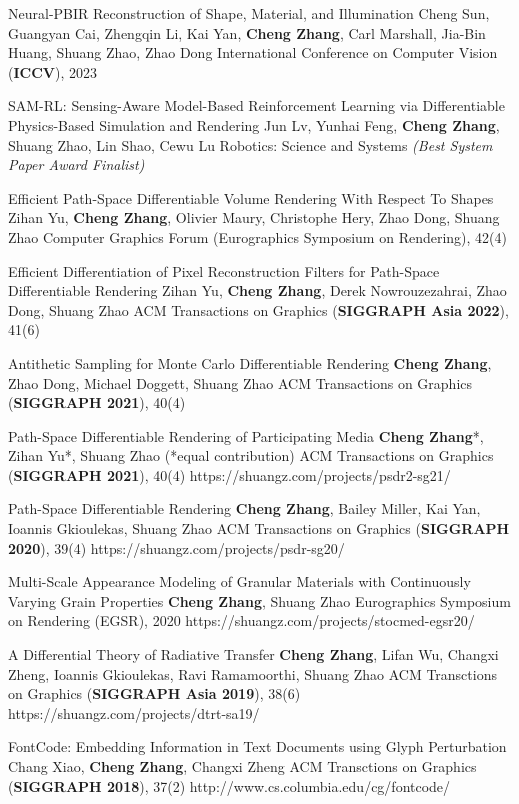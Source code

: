 
\begin{cvpublications}{}

    \cvpublication
	{Neural-PBIR Reconstruction of Shape, Material, and Illumination}
	{Cheng Sun, Guangyan Cai, Zhengqin Li, Kai Yan, \textbf{Cheng Zhang}, Carl Marshall, Jia-Bin Huang, Shuang Zhao, Zhao Dong}
	{International Conference on Computer Vision (\textbf{ICCV}), 2023}
	{}

    \cvpublication
	{SAM-RL: Sensing-Aware Model-Based Reinforcement Learning via Differentiable Physics-Based Simulation and Rendering}
	{Jun Lv, Yunhai Feng, \textbf{Cheng Zhang}, Shuang Zhao, Lin Shao, Cewu Lu}
	{Robotics: Science and Systems \emph{(Best System Paper Award Finalist)}}
	{}


    \cvpublication
	{Efficient Path-Space Differentiable Volume Rendering With Respect To Shapes}
	{Zihan Yu, \textbf{Cheng Zhang}, Olivier Maury, Christophe Hery, Zhao Dong, Shuang Zhao}
	{Computer Graphics Forum (Eurographics Symposium on Rendering), 42(4)}
	{}

    \cvpublication
	{Efficient Differentiation of Pixel Reconstruction Filters for Path-Space Differentiable Rendering}
	{Zihan Yu, \textbf{Cheng Zhang},  Derek Nowrouzezahrai, Zhao Dong, Shuang Zhao}
	{ACM Transactions on Graphics (\textbf{SIGGRAPH Asia 2022}), 41(6)}
	{}

    \cvpublication
	{Antithetic Sampling for Monte Carlo Differentiable Rendering}
	{\textbf{Cheng Zhang}, Zhao Dong, Michael Doggett, Shuang Zhao}
	{ACM Transactions on Graphics (\textbf{SIGGRAPH 2021}), 40(4)}
	{}


    \cvpublication
	{Path-Space Differentiable Rendering of Participating Media}
	{\textbf{Cheng Zhang}*, Zihan Yu*, Shuang Zhao (*equal contribution)}
	{ACM Transactions on Graphics (\textbf{SIGGRAPH 2021}), 40(4)}
	{https://shuangz.com/projects/psdr2-sg21/}


    \cvpublication
	{Path-Space Differentiable Rendering}
	{\textbf{Cheng Zhang}, Bailey Miller, Kai Yan, Ioannis Gkioulekas, Shuang Zhao}
	{ACM Transactions on Graphics (\textbf{SIGGRAPH 2020}), 39(4)}
	{https://shuangz.com/projects/psdr-sg20/}

    \cvpublication
	{Multi-Scale Appearance Modeling of Granular Materials with Continuously Varying Grain Properties}
	{\textbf{Cheng Zhang}, Shuang Zhao}
	{Eurographics Symposium on Rendering (EGSR), 2020}
	{https://shuangz.com/projects/stocmed-egsr20/}

    \cvpublication
	{A Differential Theory of Radiative Transfer}
	{\textbf{Cheng Zhang}, Lifan Wu, Changxi Zheng, Ioannis Gkioulekas, Ravi Ramamoorthi, Shuang Zhao}
	{ACM Transctions on Graphics (\textbf{SIGGRAPH Asia 2019}), 38(6)}
	{https://shuangz.com/projects/dtrt-sa19/}

	\cvpublication
	{FontCode: Embedding Information in Text Documents using Glyph Perturbation}
	{Chang Xiao, \textbf{Cheng Zhang}, Changxi Zheng}
	{ACM Transctions on Graphics (\textbf{SIGGRAPH 2018}), 37(2)}
	{http://www.cs.columbia.edu/cg/fontcode/}

\end{cvpublications}
